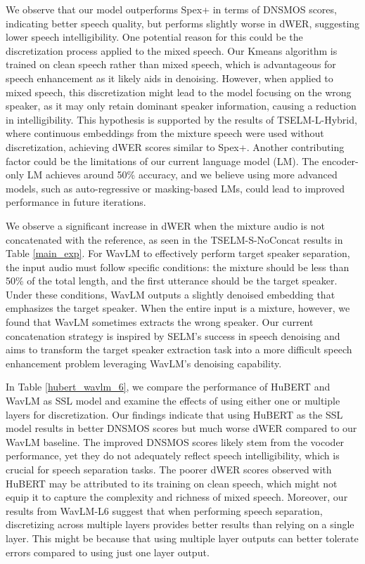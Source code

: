 \documentclass[conference]{IEEEtran}
\begin{document}
We observe that our model outperforms Spex+ in terms of DNSMOS scores, indicating better speech quality, but performs slightly worse in dWER, suggesting lower speech intelligibility. One potential reason for this could be the discretization process applied to the mixed speech. Our Kmeans algorithm is trained on clean speech rather than mixed speech, which is advantageous for speech enhancement as it likely aids in denoising. However, when applied to mixed speech, this discretization might lead to the model focusing on the wrong speaker, as it may only retain dominant speaker information, causing a reduction in intelligibility.
This hypothesis is supported by the results of TSELM-L-Hybrid, where continuous embeddings from the mixture speech were used without discretization, achieving dWER scores similar to Spex+. Another contributing factor could be the limitations of our current language model (LM). The encoder-only LM achieves around 50\% accuracy, and we believe using more advanced models, such as auto-regressive or masking-based LMs, could lead to improved performance in future iterations.

We observe a significant increase in dWER when the mixture audio is not concatenated with the reference, as seen in the TSELM-S-NoConcat results in Table \ref{main_exp}. For WavLM to effectively perform target speaker separation, the input audio must follow specific conditions: the mixture should be less than 50\% of the total length, and the first utterance should be the target speaker. Under these conditions, WavLM outputs a slightly denoised embedding that emphasizes the target speaker. When the entire input is a mixture, however, we found that WavLM sometimes extracts the wrong speaker.
Our current concatenation strategy is inspired by SELM's \cite{selm} success in speech denoising and aims to transform the target speaker extraction task into a more difficult speech enhancement problem leveraging WavLM's denoising capability.

In Table \ref{hubert_wavlm_6}, we compare the performance of HuBERT and WavLM as SSL model and examine the effects of using either one or multiple layers for discretization. Our findings indicate that using HuBERT as the SSL model results in better DNSMOS scores but much worse dWER compared to our WavLM baseline. The improved DNSMOS scores likely stem from the vocoder performance, yet they do not adequately reflect speech intelligibility, which is crucial for speech separation tasks. 
The poorer dWER scores observed with HuBERT may be attributed to its training on clean speech, which might not equip it to capture the complexity and richness of mixed speech. Moreover, our results from WavLM-L6 suggest that when performing speech separation, discretizing across multiple layers provides better results than relying on a single layer.  This might be because that using multiple layer outputs can better tolerate errors compared to using just one layer output.
\end{document}
